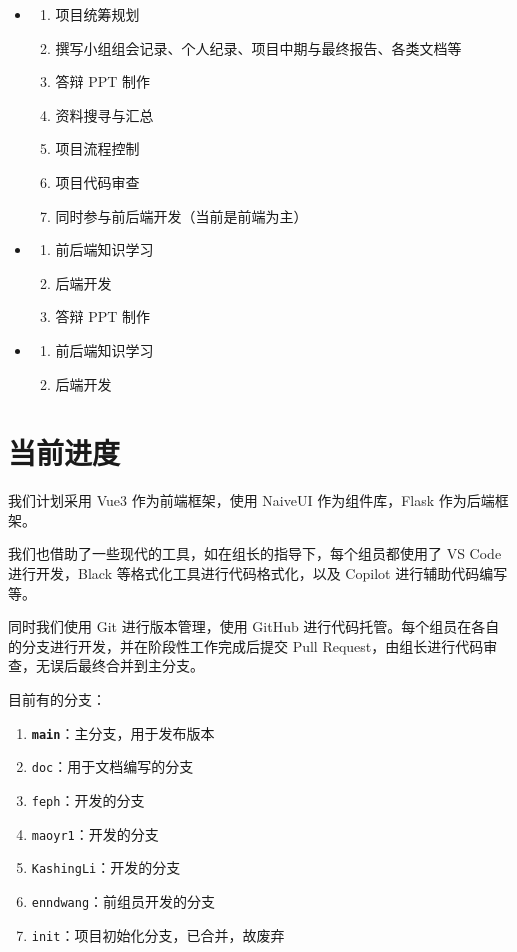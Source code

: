 \documentclass[
    UTF8,
    12pt,
    oneside,
    a4paper
]{ctexart}
\begin{document}
\begin{itemize}
    \item \textbf{\wo}
        \begin{enumerate}
            \item 项目统筹规划
            \item 撰写小组组会记录、个人纪录、项目中期与最终报告、各类文档等
            \item 答辩 PPT 制作
            \item 资料搜寻与汇总
            \item 项目流程控制
            \item 项目代码审查
            \item 同时参与前后端开发（当前是前端为主）
        \end{enumerate}
    \item \vi
        \begin{enumerate}
            \item 前后端知识学习
            \item 后端开发
            \item 答辩 PPT 制作
        \end{enumerate}
    \item \rr
        \begin{enumerate}
            \item 前后端知识学习
            \item 后端开发
        \end{enumerate}
\end{itemize}

\section{当前进度}

我们计划采用 Vue3 作为前端框架，使用 NaiveUI 作为组件库，Flask 作为后端框架。

我们也借助了一些现代的工具，如在组长的指导下，每个组员都使用了 VS Code 进行开发，Black 等格式化工具进行代码格式化，以及 Copilot 进行辅助代码编写等。

同时我们使用 Git 进行版本管理，使用 GitHub 进行代码托管。每个组员在各自的分支进行开发，并在阶段性工作完成后提交 Pull Request，由组长进行代码审查，无误后最终合并到主分支。

目前有的分支：

\begin{enumerate}
    \item \textbf{\texttt{main}}：主分支，用于发布版本
    \item \texttt{doc}：\wo 用于文档编写的分支
    \item \texttt{feph}：\wo 开发的分支
    \item \texttt{maoyr1}：\vi 开发的分支
    \item \texttt{KashingLi}：\rr 开发的分支
    \item \texttt{enndwang}：前组员\tv 开发的分支
    \item \texttt{init}：项目初始化分支，已合并，故废弃
\end{enumerate}
\end{document}
